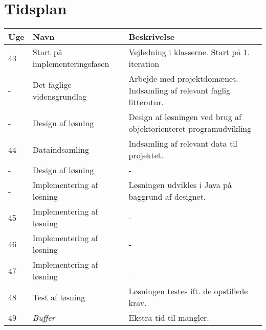 \documentclass[a4paper,12pt]{report}
\begin{document}
\section{Tidsplan}
\begin{table}[H]
\begin{tabular}{| l | l | p{7cm} |}
\hline
\textbf{Uge} & \textbf{Navn}                 & \textbf{Beskrivelse}                               \\ \hline
43           & Start på implementeringsfasen & Vejledning i klasserne. Start på 1. iteration      \\ \hline
- & Det faglige vidensgrundlag & Arbejde med projektdomænet. Indsamling af relevant faglig litteratur. \\ \hline
- & Design af løsning          & Design af løsningen ved brug af objektorienteret programudvikling     \\ \hline
44           & Dataindsamling                & Indsamling af relevant data til projektet.         \\ \hline
-            & Design af løsning             & -                                                  \\ \hline
-            & Implementering af løsning     & Løsningen udvikles i Java på baggrund af designet. \\ \hline
45           & Implementering af løsning     & -                                                  \\ \hline
46           & Implementering af løsning     & -                                                  \\ \hline
47           & Implementering af løsning     & -                                                  \\ \hline
48           & Test af løsning               & Løsningen testes ift. de opstillede krav.          \\ \hline
49           & \textit{Buffer}               & Ekstra tid til mangler.                            \\ \hline
\end{tabular}
\end{table}



\end{document}
